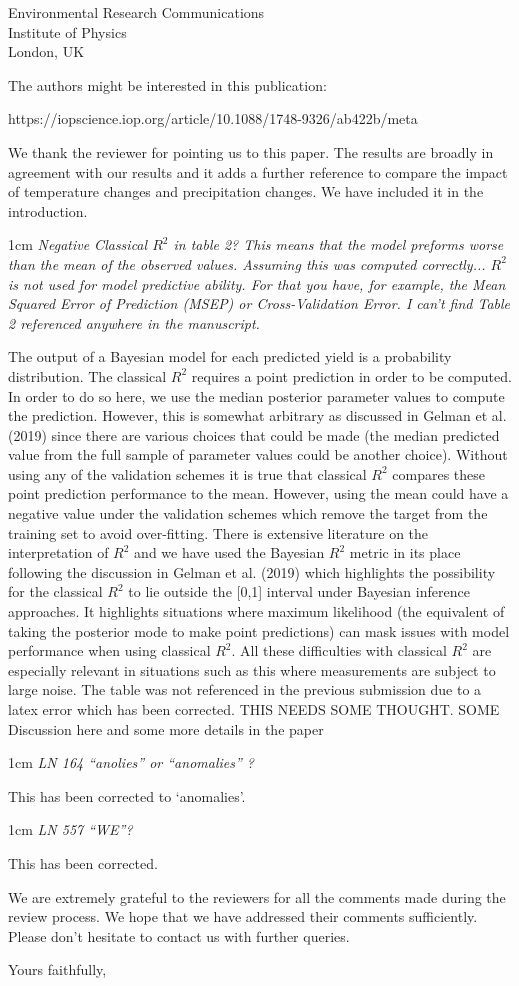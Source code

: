 \documentclass{letter}
\newcommand{\review}[1]{   
    \begin{adjustwidth}{1cm}{}
    \em{#1}
    \end{adjustwidth}
    }
\begin{document}
\begin{letter}{Environmental Research Communications \\ Institute of Physics \\ London, UK}
{The authors might be interested in this publication: 

https://iopscience.iop.org/article/10.1088/1748-9326/ab422b/meta
}

We thank the reviewer for pointing us to this paper. The results are broadly in agreement with our results and it adds a further reference to compare the impact of temperature changes and precipitation changes. We have included it in the introduction.

\review{
Negative Classical $R^2$ in table 2? This means that the model preforms worse than the mean of the observed values. Assuming this was computed correctly... $R^2$ is not used for model predictive ability. For that you have, for example, the Mean Squared Error of Prediction (MSEP) or Cross-Validation Error. I can’t find Table 2 referenced anywhere in the manuscript.
}

The output of a Bayesian model for each predicted yield is a probability distribution. The classical $R^2$ requires a point prediction in order to be computed. In order to do so here, we use the median posterior parameter values to compute the prediction. However, this is somewhat arbitrary as discussed in Gelman et al. (2019) since there are various choices that could be made (the median predicted value from the full sample of parameter values could be another choice). Without using any of the validation schemes it is true that classical $R^2$ compares these point prediction performance to the mean. However, using the mean could have a negative value under the validation schemes which remove the target from the training set to avoid over-fitting. There is extensive literature on the interpretation of $R^2$ and we have used the Bayesian $R^2$ metric in its place following the discussion in Gelman et al. (2019) which highlights the possibility for the classical $R^2$ to lie outside the [0,1] interval under Bayesian inference approaches. It highlights situations where maximum likelihood (the equivalent of taking the posterior mode to make point predictions) can mask issues with model performance when using classical $R^2$. All these difficulties with classical $R^2$ are especially relevant in situations such as this where measurements are subject to large noise. The table was not referenced in the previous submission due to a latex error which has been corrected. {\color{red} THIS NEEDS SOME THOUGHT. SOME Discussion here and some more details in the paper}

\review{
LN 164 “anolies” or “anomalies” ?
}

This has been corrected to `anomalies'.

\review{
LN 557 “WE”?
}

This has been corrected.


We are extremely grateful to the reviewers for all the comments made during the review process. We hope that we have addressed their comments sufficiently. Please don't hesitate to contact us with further queries.

\closing{Yours faithfully,}

\end{letter}
\end{document}
